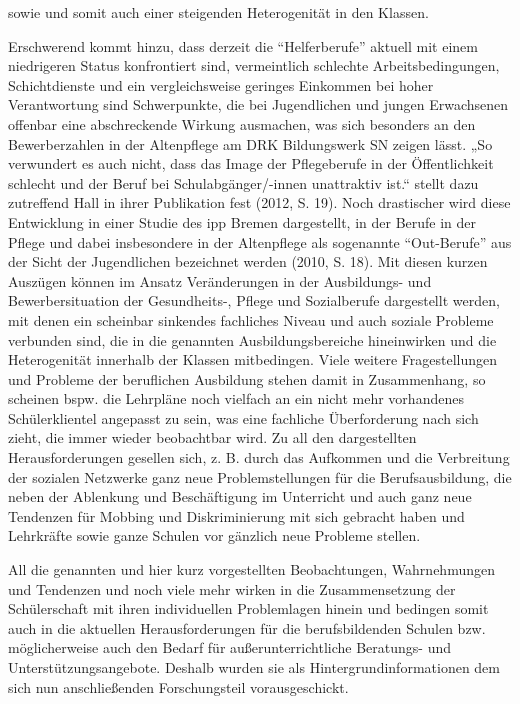 sowie und somit auch einer steigenden Heterogenität in den Klassen. 

Erschwerend kommt hinzu, dass derzeit die "`Helferberufe"' aktuell mit einem niedrigeren Status konfrontiert sind, vermeintlich schlechte Arbeitsbedingungen, Schichtdienste und ein vergleichsweise geringes Einkommen bei hoher Verantwortung sind Schwerpunkte, die bei Jugendlichen und jungen Erwachsenen offenbar eine abschreckende Wirkung ausmachen, was sich besonders an den Bewerberzahlen in der Altenpflege am DRK Bildungswerk SN zeigen lässt. „So verwundert es auch nicht, dass das Image der Pflegeberufe in der Öffentlichkeit schlecht und der Beruf bei Schulabgänger/-innen unattraktiv ist.“ stellt dazu zutreffend Hall in ihrer Publikation fest (2012, S. 19). Noch drastischer wird diese Entwicklung in einer Studie des ipp Bremen dargestellt, in der Berufe in der Pflege und dabei insbesondere in der Altenpflege als sogenannte "`Out-Berufe"' aus der Sicht der Jugendlichen bezeichnet werden (2010, S. 18). Mit diesen kurzen Auszügen können im Ansatz Veränderungen in der Ausbildungs- und Bewerbersituation der Gesundheits-, Pflege und Sozialberufe dargestellt werden, mit denen ein scheinbar sinkendes fachliches Niveau und auch soziale Probleme verbunden sind, die in die genannten Ausbildungsbereiche hineinwirken und die Heterogenität innerhalb der Klassen mitbedingen. Viele weitere Fragestellungen und Probleme der beruflichen Ausbildung stehen damit in Zusammenhang, so scheinen bspw. die Lehrpläne noch vielfach an ein nicht mehr vorhandenes Schülerklientel angepasst zu sein, was eine fachliche Überforderung nach sich zieht, die immer wieder beobachtbar wird. Zu all den dargestellten Herausforderungen gesellen sich, z. B. durch das Aufkommen und die Verbreitung der sozialen Netzwerke ganz neue Problemstellungen für die Berufsausbildung, die neben der Ablenkung und Beschäftigung im Unterricht und auch ganz neue Tendenzen  für Mobbing und Diskriminierung mit sich gebracht haben und Lehrkräfte sowie ganze Schulen vor gänzlich neue Probleme stellen.

All die genannten und hier kurz vorgestellten Beobachtungen, Wahrnehmungen und Tendenzen und noch viele mehr wirken in die Zusammensetzung der Schülerschaft mit ihren individuellen Problemlagen hinein und bedingen somit auch in die aktuellen Herausforderungen für die berufsbildenden Schulen bzw. möglicherweise auch den Bedarf für außerunterrichtliche Beratungs- und Unterstützungsangebote. Deshalb wurden sie als Hintergrundinformationen dem sich nun anschließenden Forschungsteil vorausgeschickt. 
